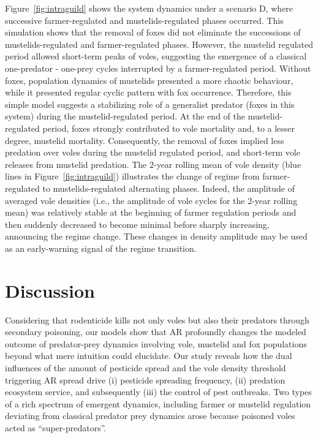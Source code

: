 \documentclass[11pt]{article}
\begin{document}
Figure~\ref{fig:intraguild} shows the system dynamics under a scenario D, where successive farmer-regulated and mustelids-regulated phases occurred.
%
This simulation shows that the removal of foxes did not eliminate the successions of mustelids-regulated and farmer-regulated phases. However, the mustelid regulated period allowed short-term peaks of voles, suggesting the emergence of a classical one-predator - one-prey cycles interrupted by a farmer-regulated period. Without foxes, population dynamics of mustelids presented a more chaotic behaviour, while it presented regular cyclic pattern with fox occurrence.
%
Therefore, this simple model suggests a stabilizing role of a generalist predator (foxes in this system) during the mustelid-regulated period. At the end of the mustelid-regulated period, foxes strongly contributed to vole mortality and, to a lesser degree, mustelid mortality. Consequently, the removal of foxes implied less predation over voles during the mustelid regulated period, and short-term vole releases from mustelid predation. The 2-year rolling mean of vole density (blue lines in Figure~\ref{fig:intraguild}) illustrates the change of regime from farmer-regulated to mustelids-regulated alternating phases.
%
Indeed, the amplitude of averaged vole densities (i.e., the amplitude of vole cycles for the 2-year rolling mean) was relatively stable at the beginning of farmer regulation periods and then suddenly decreased to become minimal before sharply increasing, announcing the regime change. These changes in density amplitude may be used as an early-warning signal of the regime transition. 


\section{Discussion} 

Considering that rodenticide kills not only voles but also their predators through secondary poisoning, our models show that AR profoundly changes the modeled outcome of predator-prey dynamics involving vole, mustelid and fox populations beyond what mere intuition could elucidate. Our study reveals how the dual influences of the amount of pesticide spread and the vole density threshold triggering AR spread drive (i) pesticide spreading frequency, (ii) predation ecosystem service, and subsequently (iii) the control of pest outbreaks. Two types of a rich spectrum of emergent dynamics, including farmer or mustelid regulation deviating from classical predator prey dynamics arose because poisoned voles acted as “super-predators”. 
\end{document}
